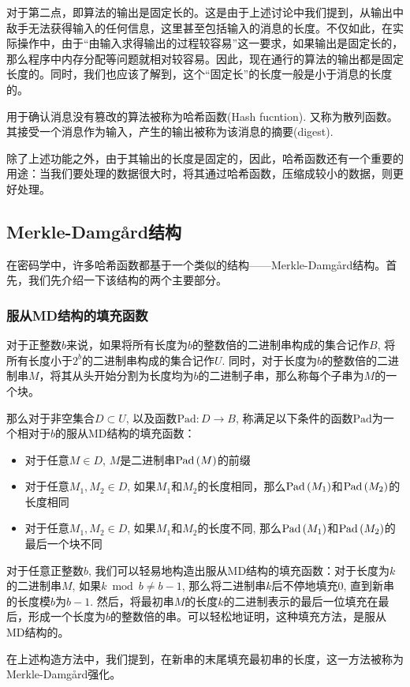 对于第二点，即算法的输出是固定长的。这是由于上述讨论中我们提到，从输出中敌手无法获得输入的任何信息，这里甚至包括输入的消息的长度。不仅如此，在实际操作中，由于“由输入求得输出的过程较容易”这一要求，如果输出是固定长的，那么程序中内存分配等问题就相对较容易。因此，现在通行的算法的输出都是固定长度的。同时，我们也应该了解到，这个“固定长”的长度一般是小于消息的长度的。\par
用于确认消息没有篡改的算法被称为哈希函数(Hash fucntion). 又称为散列函数。其接受一个消息作为输入，产生的输出被称为该消息的摘要(digest).\par
除了上述功能之外，由于其输出的长度是固定的，因此，哈希函数还有一个重要的用途：当我们要处理的数据很大时，将其通过哈希函数，压缩成较小的数据，则更好处理。
\subsection{Merkle-Damg\aa rd结构}
在密码学中，许多哈希函数都基于一个类似的结构——Merkle-Damg\aa rd结构。首先，我们先介绍一下该结构的两个主要部分。
\subsubsection{服从MD结构的填充函数}
对于正整数$b$来说，如果将所有长度为$b$的整数倍的二进制串构成的集合记作$B$, 将所有长度小于$2^b$的二进制串构成的集合记作$U$. 同时，对于长度为$b$的整数倍的二进制串$M$，将其从头开始分割为长度均为$b$的二进制子串，那么称每个子串为$M$的一个块。\par
那么对于非空集合$D\subset U$, 以及函数$\mathrm{Pad}:D\to B$, 称满足以下条件的函数$\mathrm{Pad}$为一个相对于$b$的服从MD结构的填充函数：
\begin{itemize}
	\item 对于任意$M\in D$, $M$是二进制串$\mathrm{Pad}\left( {M}\right)$的前缀
	\item 对于任意$M_1, M_2\in D$, 如果$M_1$和$M_2$的长度相同，那么$\mathrm{Pad}\left( {M_1}\right)$和$\mathrm{Pad}\left( {M_2}\right)$的长度相同
	\item 对于任意$M_1, M_2\in D$, 如果$M_1$和$M_2$的长度不同, 那么$\mathrm{Pad}\left( {M_1}\right)$和$\mathrm{Pad}\left( {M_2}\right)$的最后一个块不同
\end{itemize}

对于任意正整数$b$, 我们可以轻易地构造出服从MD结构的填充函数：对于长度为$k$的二进制串$M$, 如果$k\bmod b\neq b-1$, 那么将二进制串$k$后不停地填充$0$, 直到新串的长度模$b$为$b-1$. 然后，将最初串$M$的长度$k$的二进制表示的最后一位填充在最后，形成一个长度为$b$的整数倍的串。可以轻松地证明，这种填充方法，是服从MD结构的。\par
在上述构造方法中，我们提到，在新串的末尾填充最初串的长度，这一方法被称为Merkle-Damg\aa rd强化。
